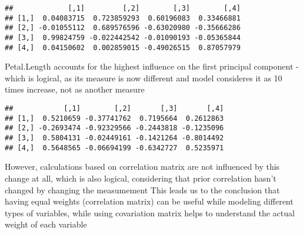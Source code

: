 \documentclass[
]{article}
\newenvironment{Shaded}{\begin{snugshade}}{\end{snugshade}}
\newcommand{\CommentTok}[1]{\textcolor[rgb]{0.56,0.35,0.01}{\textit{#1}}}
\newcommand{\FunctionTok}[1]{\textcolor[rgb]{0.13,0.29,0.53}{\textbf{#1}}}
\newcommand{\NormalTok}[1]{#1}
\newcommand{\OtherTok}[1]{\textcolor[rgb]{0.56,0.35,0.01}{#1}}
\newcommand{\SpecialCharTok}[1]{\textcolor[rgb]{0.81,0.36,0.00}{\textbf{#1}}}
\begin{document}
\begin{Shaded}
\end{Shaded}

\begin{verbatim}
##             [,1]         [,2]        [,3]        [,4]
## [1,]  0.04083715  0.723859293  0.60196083  0.33466881
## [2,] -0.01055112  0.689576596 -0.63020980 -0.35666286
## [3,]  0.99824759 -0.022442542 -0.01090193 -0.05365844
## [4,]  0.04150602  0.002859015 -0.49026515  0.87057979
\end{verbatim}

Petal.Length accounts for the highest influence on the first principal
component - which is logical, as its measure is now different and model
consideres it as 10 times increase, not as another measure

\begin{Shaded}
\end{Shaded}

\begin{verbatim}
##            [,1]        [,2]       [,3]       [,4]
## [1,]  0.5210659 -0.37741762  0.7195664  0.2612863
## [2,] -0.2693474 -0.92329566 -0.2443818 -0.1235096
## [3,]  0.5804131 -0.02449161 -0.1421264 -0.8014492
## [4,]  0.5648565 -0.06694199 -0.6342727  0.5235971
\end{verbatim}

However, calculations based on correlation matrix are not influenced by
this change at all, which is also logical, considering that prior
correlation hasn't changed by changing the measumement This leads us to
the conclusion that having equal weights (correlation matrix) can be
useful while modeling different types of variables, while using
covariation matrix helps to understand the actual weight of each
variable
\end{document}
